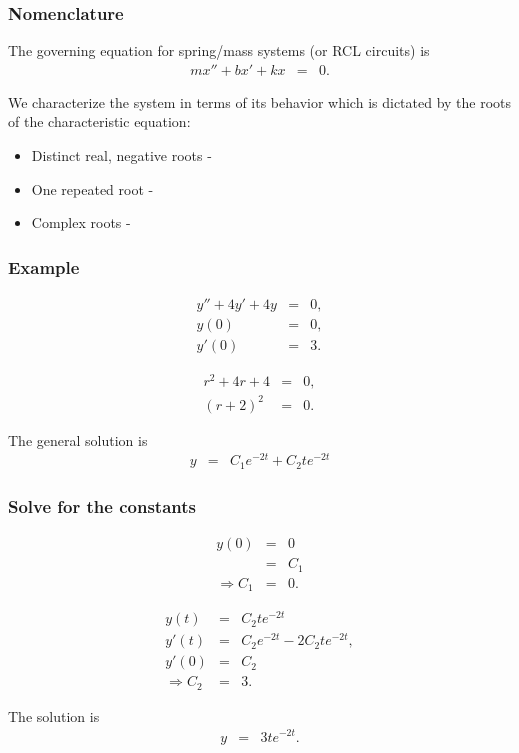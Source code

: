 \begin{frame}
  \frametitle{Nomenclature}

  The governing equation for spring/mass systems (or RCL circuits) is
  \begin{eqnarray*}
    m x'' + b x' + k x & = & 0.
  \end{eqnarray*}

  We characterize the system in terms of its behavior which is
  dictated by the roots of the characteristic equation:
  \begin{itemize}
  \item Distinct real, negative roots - \textit{}
  \item One repeated root - \textit{}
  \item Complex roots - \textit{}
  \end{itemize}

\end{frame}

\begin{frame}
  \frametitle{Example}

  \begin{eqnarray*}
    y'' + 4y' + 4y & = & 0, \\
    y(0) & = & 0, \\
    y'(0) & = & 3.
  \end{eqnarray*}

  {
    \begin{eqnarray*}
      r^2 + 4r + 4 & = & 0, \\
      (r+2)^2 & = & 0.
    \end{eqnarray*}

    The general solution is
    \begin{eqnarray*}
      y & = & C_1 e^{-2t} + C_2 t e^{-2t}
    \end{eqnarray*}

  }

\end{frame}



\begin{frame}
  \frametitle{Solve for the constants}

  \begin{eqnarray*}
    y(0) & = & 0 \\
    & = & C_1 \\
    \Rightarrow C_1 & = & 0.
  \end{eqnarray*}

  \begin{eqnarray*}
    y(t) & = & C_2 t e^{-2t} \\
    y'(t) & = & C_2 e^{-2t} - 2 C_2 t e^{-2t}, \\
    y'(0) & = & C_2 \\
    \Rightarrow C_2 & = & 3.
  \end{eqnarray*}

  The solution is
  \begin{eqnarray*}
    y & = & 3 t e^{-2t}.
  \end{eqnarray*}

\end{frame}

